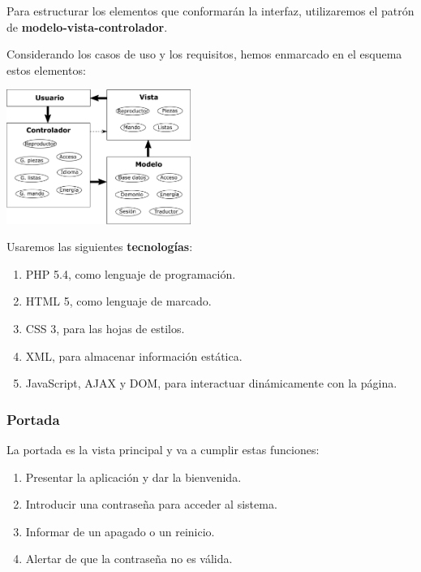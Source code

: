 \documentclass[10pt,a4paper]{article}
\begin{document}
	\begin{multicols}{2}
		Para estructurar los elementos que conformarán la interfaz, utilizaremos el patrón de \textbf{modelo-vista-controlador}.
		
		Considerando los casos de uso y los requisitos, hemos enmarcado en el esquema estos elementos:
		\columnbreak
		\begin{center}
			\includegraphics[width=0.45\textwidth]{images/mvc_completo} 
		\end{center}
	\end{multicols}
	
	Usaremos las siguientes \textbf{tecnologías}:
	
	\begin{enumerate}
		\item PHP 5.4, como lenguaje de programación.
		\item HTML 5, como lenguaje de marcado.
		\item CSS 3, para las hojas de estilos.
		\item XML, para almacenar información estática.
		\item JavaScript, AJAX y DOM, para interactuar dinámicamente con la página.
	\end{enumerate}
	
	\subsubsection*{Portada}
	
	La portada es la vista principal y va a cumplir estas funciones:
	
	\begin{enumerate}
		\item Presentar la aplicación y dar la bienvenida.
		\item Introducir una contraseña para acceder al sistema.
		\item Informar de un apagado o un reinicio.
		\item Alertar de que la contraseña no es válida.
	\end{enumerate}
	
\end{document}
